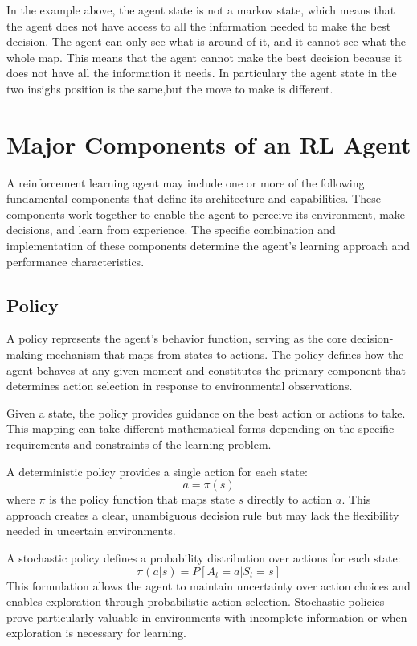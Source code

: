     In the example above, the agent state is not a markov state, which means that the agent does not have access to all the information needed to make the best decision. The agent can only see what is around of it, and it cannot see what the whole map. This means that the agent cannot make the best decision because it does not have all the information it needs. In particulary the agent state in the two insighs position is the same,but the move to make is different.


\section{Major Components of an RL Agent}


    A reinforcement learning agent may include one or more of the following fundamental components that define its architecture and capabilities. These components work together to enable the agent to perceive its environment, make decisions, and learn from experience. The specific combination and implementation of these components determine the agent's learning approach and performance characteristics.


\subsection{Policy}

    A policy represents the agent's behavior function, serving as the core decision-making mechanism that maps from states to actions. The policy defines how the agent behaves at any given moment and constitutes the primary component that determines action selection in response to environmental observations.
    
    Given a state, the policy provides guidance on the best action or actions to take. This mapping can take different mathematical forms depending on the specific requirements and constraints of the learning problem.
    
    A deterministic policy provides a single action for each state:
    \begin{equation}
    a = \pi(s)
    \end{equation}
    where $\pi$ is the policy function that maps state $s$ directly to action $a$. This approach creates a clear, unambiguous decision rule but may lack the flexibility needed in uncertain environments.
    
    A stochastic policy defines a probability distribution over actions for each state:
    \begin{equation}
    \pi(a|s) = P[A_t = a | S_t = s]
    \end{equation}
    This formulation allows the agent to maintain uncertainty over action choices and enables exploration through probabilistic action selection. Stochastic policies prove particularly valuable in environments with incomplete information or when exploration is necessary for learning.


